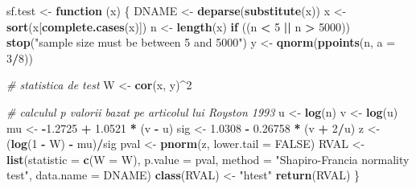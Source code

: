\documentclass[]{article}
\newenvironment{Shaded}{\begin{snugshade}}{\end{snugshade}}
\newcommand{\KeywordTok}[1]{\textcolor[rgb]{0.13,0.29,0.53}{\textbf{#1}}}
\newcommand{\DataTypeTok}[1]{\textcolor[rgb]{0.13,0.29,0.53}{#1}}
\newcommand{\DecValTok}[1]{\textcolor[rgb]{0.00,0.00,0.81}{#1}}
\newcommand{\FloatTok}[1]{\textcolor[rgb]{0.00,0.00,0.81}{#1}}
\newcommand{\StringTok}[1]{\textcolor[rgb]{0.31,0.60,0.02}{#1}}
\newcommand{\CommentTok}[1]{\textcolor[rgb]{0.56,0.35,0.01}{\textit{#1}}}
\newcommand{\OtherTok}[1]{\textcolor[rgb]{0.56,0.35,0.01}{#1}}
\newcommand{\ControlFlowTok}[1]{\textcolor[rgb]{0.13,0.29,0.53}{\textbf{#1}}}
\newcommand{\OperatorTok}[1]{\textcolor[rgb]{0.81,0.36,0.00}{\textbf{#1}}}
\newcommand{\NormalTok}[1]{#1}
\begin{document}
\begin{Shaded}
\begin{Highlighting}[]
\NormalTok{sf.test <-}\StringTok{ }\ControlFlowTok{function}\NormalTok{ (x) }
\NormalTok{\{}
\NormalTok{    DNAME <-}\StringTok{ }\KeywordTok{deparse}\NormalTok{(}\KeywordTok{substitute}\NormalTok{(x))}
\NormalTok{    x <-}\StringTok{ }\KeywordTok{sort}\NormalTok{(x[}\KeywordTok{complete.cases}\NormalTok{(x)])}
\NormalTok{    n <-}\StringTok{ }\KeywordTok{length}\NormalTok{(x)}
    \ControlFlowTok{if}\NormalTok{ ((n }\OperatorTok{<}\StringTok{ }\DecValTok{5} \OperatorTok{||}\StringTok{ }\NormalTok{n }\OperatorTok{>}\StringTok{ }\DecValTok{5000}\NormalTok{)) }
        \KeywordTok{stop}\NormalTok{(}\StringTok{"sample size must be between 5 and 5000"}\NormalTok{)}
\NormalTok{    y <-}\StringTok{ }\KeywordTok{qnorm}\NormalTok{(}\KeywordTok{ppoints}\NormalTok{(n, }\DataTypeTok{a =} \DecValTok{3}\OperatorTok{/}\DecValTok{8}\NormalTok{))}
    
    \CommentTok{# statistica de test}
\NormalTok{    W <-}\StringTok{ }\KeywordTok{cor}\NormalTok{(x, y)}\OperatorTok{^}\DecValTok{2}
    
    \CommentTok{# calculul p valorii bazat pe articolul lui Royston 1993}
\NormalTok{    u <-}\StringTok{ }\KeywordTok{log}\NormalTok{(n)}
\NormalTok{    v <-}\StringTok{ }\KeywordTok{log}\NormalTok{(u)}
\NormalTok{    mu <-}\StringTok{ }\OperatorTok{-}\FloatTok{1.2725} \OperatorTok{+}\StringTok{ }\FloatTok{1.0521} \OperatorTok{*}\StringTok{ }\NormalTok{(v }\OperatorTok{-}\StringTok{ }\NormalTok{u)}
\NormalTok{    sig <-}\StringTok{ }\FloatTok{1.0308} \OperatorTok{-}\StringTok{ }\FloatTok{0.26758} \OperatorTok{*}\StringTok{ }\NormalTok{(v }\OperatorTok{+}\StringTok{ }\DecValTok{2}\OperatorTok{/}\NormalTok{u)}
\NormalTok{    z <-}\StringTok{ }\NormalTok{(}\KeywordTok{log}\NormalTok{(}\DecValTok{1} \OperatorTok{-}\StringTok{ }\NormalTok{W) }\OperatorTok{-}\StringTok{ }\NormalTok{mu)}\OperatorTok{/}\NormalTok{sig}
\NormalTok{    pval <-}\StringTok{ }\KeywordTok{pnorm}\NormalTok{(z, }\DataTypeTok{lower.tail =} \OtherTok{FALSE}\NormalTok{)}
\NormalTok{    RVAL <-}\StringTok{ }\KeywordTok{list}\NormalTok{(}\DataTypeTok{statistic =} \KeywordTok{c}\NormalTok{(}\DataTypeTok{W =}\NormalTok{ W), }\DataTypeTok{p.value =}\NormalTok{ pval, }
                 \DataTypeTok{method =} \StringTok{"Shapiro-Francia normality test"}\NormalTok{, }
        \DataTypeTok{data.name =}\NormalTok{ DNAME)}
    \KeywordTok{class}\NormalTok{(RVAL) <-}\StringTok{ "htest"}
    \KeywordTok{return}\NormalTok{(RVAL)}
\NormalTok{\}}
\end{Highlighting}
\end{Shaded}
\end{document}
